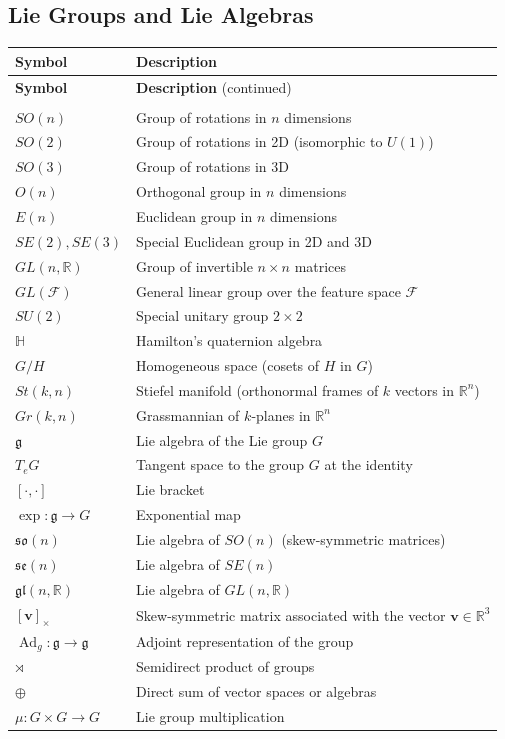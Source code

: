 \subsection*{Lie Groups and Lie Algebras}
\begin{longtable}{>{\centering\arraybackslash}p{}p{}}
\toprule
\textbf{Symbol} & \textbf{Description} \\
\midrule
\endfirsthead
\toprule
\textbf{Symbol} & \textbf{Description} {\small(continued)} \\
\midrule
\endhead
\midrule
\multicolumn{2}{r}{\small\textit{Continued on the next page}} \\
\endfoot
\bottomrule
\endlastfoot
$SO(n)$ & Group of rotations in $n$ dimensions \\
$SO(2)$ & Group of rotations in 2D (isomorphic to $U(1)$) \\
$SO(3)$ & Group of rotations in 3D \\
$O(n)$ & Orthogonal group in $n$ dimensions \\
$E(n)$ & Euclidean group in $n$ dimensions \\
$SE(2), SE(3)$ & Special Euclidean group in 2D and 3D \\
$GL(n, \mathbb{R})$ & Group of invertible $n \times n$ matrices \\
$GL(\mathcal{F})$ & General linear group over the feature space $\mathcal{F}$ \\
$SU(2)$ & Special unitary group $2 \times 2$ \\
$\mathbb{H}$ & Hamilton's quaternion algebra \\
$G/H$ & Homogeneous space (cosets of $H$ in $G$) \\
$St(k,n)$ & Stiefel manifold (orthonormal frames of $k$ vectors in $\mathbb{R}^n$) \\
$Gr(k,n)$ & Grassmannian of $k$-planes in $\mathbb{R}^n$ \\
$\mathfrak{g}$ & Lie algebra of the Lie group $G$ \\
$T_e G$ & Tangent space to the group $G$ at the identity \\
$[\cdot, \cdot]$ & Lie bracket \\
$\exp: \mathfrak{g} \rightarrow G$ & Exponential map \\
$\mathfrak{so}(n)$ & Lie algebra of $SO(n)$ (skew-symmetric matrices) \\
$\mathfrak{se}(n)$ & Lie algebra of $SE(n)$ \\
$\mathfrak{gl}(n, \mathbb{R})$ & Lie algebra of $GL(n, \mathbb{R})$ \\
$[\mathbf{v}]_\times$ & Skew-symmetric matrix associated with the vector $\mathbf{v} \in \mathbb{R}^3$ \\
$\operatorname{Ad}_g: \mathfrak{g} \to \mathfrak{g}$ & Adjoint representation of the group \\
$\rtimes$ & Semidirect product of groups \\
$\oplus$ & Direct sum of vector spaces or algebras \\
$\mu: G \times G \to G$ & Lie group multiplication \\
\end{longtable}

